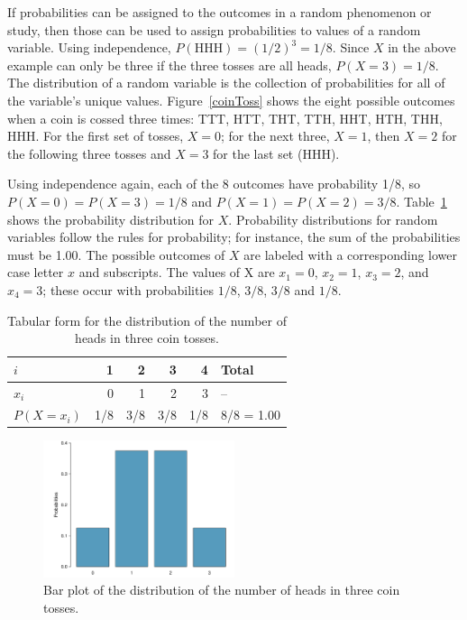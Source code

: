 If probabilities can be assigned to the outcomes in a random phenomenon or study, then those can be used to assign probabilities to values of a random variable.  Using independence, $P(\text{HHH}) = (1/2)^3 = 1/8$.  Since $X$ in the above example can only be three if the three tosses are all heads, $P(X=3) = 1/8$.  The distribution of a random variable is the collection of probabilities for all of the variable's unique values. Figure~\ref{coinToss} shows the eight possible outcomes when a coin is cossed three times: TTT, HTT, THT, TTH, HHT, HTH, THH, HHH. For the first set of tosses, $X = 0$; for the next three, $X=1$, then $X=2$ for the following three tosses and $X=3$ for the last set (HHH).  

Using independence again, each of the 8 outcomes have probability 1/8, so $P(X = 0) = P(X = 3) = 1/8$ and $P(X = 1) = P(X = 2) = 3/8$. Table~\ref{distCoinTossing} shows the probability distribution for $X$.  Probability distributions for random variables follow the rules for probability; for instance, the sum of the probabilities must be 1.00.  The possible outcomes of $X$ are labeled with a corresponding lower case letter $x$ and subscripts.  The values of X are $x_1=0$, $x_2=1$,  $x_3 = 2$, and $x_4 = 3$; these occur with probabilities $1/8$, $3/8$, $3/8$ and $1/8$.

\begin{table}[h]
	\centering 
	\begin{tabular}{l rrrr l}
		\hline 
		$i$ & 1 & 2 & 3 & 4 & Total\\
		\hline
		$x_i$ & 0 & 1 & 2 & 3 & --\\
		$P(X = x_i)$ & 1/8 & 3/8 & 3/8 & 1/8 & 8/8 = 1.00\\
	\end{tabular}
	\caption{Tabular form for the distribution of the number of heads in three coin tosses.}
	\label{distCoinTossing}
\end{table}

\begin{figure}[h]
\centering
\includegraphics[width=0.5\textwidth]
{ch_probability_oi_biostat/figures/barPlotCoinTossing/barPlotCoinTossing.pdf}
\caption{Bar plot of the distribution of the number of heads in three coin tosses.}
\label{barPlotCoinTossing}
\end{figure}

